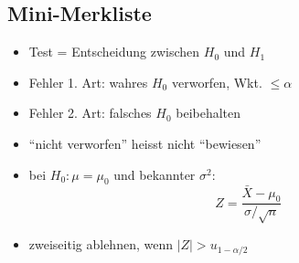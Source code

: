 \documentclass[a4paper,11pt]{article}
\begin{document}
\subsection{Mini-Merkliste}
\begin{itemize}
  \item Test = Entscheidung zwischen $H_0$ und $H_1$
  \item Fehler 1. Art: wahres $H_0$ verworfen, Wkt. $\le \alpha$
  \item Fehler 2. Art: falsches $H_0$ beibehalten
  \item ``nicht verworfen'' heisst nicht ``bewiesen''
  \item bei $H_0:\mu=\mu_0$ und bekannter $\sigma^2$:
  \[
  Z=\frac{\bar X-\mu_0}{\sigma/\sqrt n}
  \]
  \item zweiseitig ablehnen, wenn $\displaystyle |Z|>u_{1-\alpha/2}$
\end{itemize}
\end{document}
